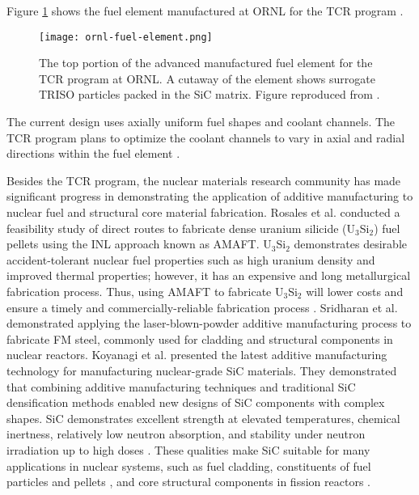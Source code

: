 Figure \ref{fig:ornl-fuel-element} shows the fuel element manufactured at 
\gls{ORNL} for the \gls{TCR} program \cite{betzler_transformational_2020}. 
\begin{figure}[htb!]
    \centering
    \texttt{[image: ornl-fuel-element.png]} 
    \caption{The top portion of the advanced manufactured fuel element 
    for the \acrfull{TCR} program at \acrfull{ORNL}.
    A cutaway of the element shows surrogate TRISO particles packed in the SiC matrix.
    Figure reproduced from \cite{betzler_transformational_2020}.}
    \label{fig:ornl-fuel-element}
\end{figure}
The current design uses axially uniform fuel shapes and coolant channels. 
The \gls{TCR} program plans to optimize the coolant channels to vary in axial 
and radial directions within the fuel element 
\cite{betzler_transformational_2020,sobes_artificial_2020}. 

Besides the \gls{TCR} program, the nuclear materials research community has made 
significant progress in demonstrating the application of additive manufacturing 
to nuclear fuel and structural core material fabrication. 
Rosales et al. \cite{rosales_characterizing_2019} conducted a feasibility study 
of direct routes to fabricate dense uranium silicide (U$_3$Si$_2$) fuel pellets 
using the \gls{INL} approach known as \gls{AMAFT}. 
U$_3$Si$_2$ demonstrates desirable accident-tolerant nuclear fuel properties 
such as high uranium density and improved thermal properties; however, it has 
an expensive and long metallurgical fabrication process. 
Thus, using \gls{AMAFT} to fabricate U$_3$Si$_2$ will lower costs and ensure a
timely and commercially-reliable fabrication process \cite{rosales_characterizing_2019}. 
Sridharan et al. \cite{sridharan_performance_2019} demonstrated applying
the laser-blown-powder additive manufacturing process to fabricate \gls{FM} steel, 
commonly used for cladding and structural components in nuclear reactors. 
Koyanagi et al. \cite{koyanagi_additive_2020} presented the latest 
additive manufacturing technology for manufacturing nuclear-grade \gls{SiC} materials. 
They demonstrated that combining additive manufacturing techniques and 
traditional \gls{SiC} densification methods enabled new designs of \gls{SiC} 
components with complex shapes. 
\gls{SiC} demonstrates excellent strength at elevated temperatures, chemical inertness, 
relatively low neutron absorption, and stability under neutron irradiation up 
to high doses \cite{sauder_ceramic_2014, snead_handbook_2007,koyanagi_additive_2020}. 
These qualities make \gls{SiC} suitable for many applications in nuclear systems, 
such as fuel cladding, constituents of fuel particles \cite{snead_handbook_2007} 
and pellets \cite{terrani_progress_2015}, and core structural components in fission 
reactors \cite{sauder_ceramic_2014}. 

